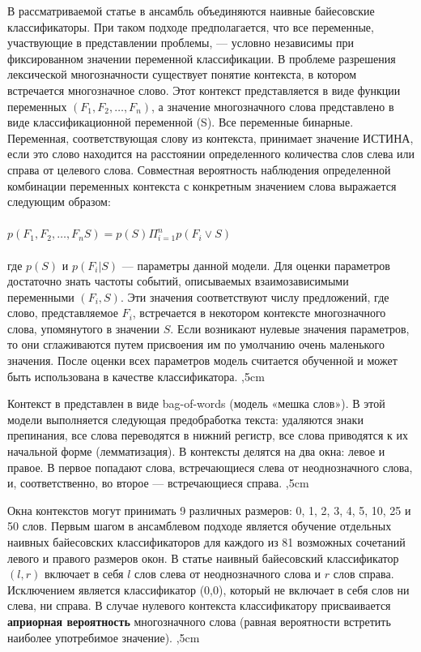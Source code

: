 \documentclass{article}
\begin{document}
\begin{articletext}
В рассматриваемой статье \cite{Pedersen 2000} в ансамбль объединяются наивные байесовские классификаторы. При таком подходе предполагается, что все переменные, участвующие в представлении проблемы, --- условно независимы при фиксированном значении переменной классификации. В проблеме разрешения лексической многозначности существует понятие контекста, в котором встречается многозначное слово. Этот контекст представляется в виде функции переменных $(F_1, F_2, \ldots , F_n)$, а значение многозначного слова представлено в виде классификационной переменной (S). Все переменные бинарные. Переменная, соответствующая слову из контекста, принимает значение ИСТИНА, если это слово находится на расстоянии определенного количества слов слева или справа от целевого слова. Совместная вероятность наблюдения определенной комбинации переменных контекста с конкретным значением слова выражается следующим образом: 
\\
\\
$p(F_1, F_2, \ldots , F_nS) = p(S)\Pi^n_{i=1}p(F_i \vee S)$ 
\\
\\
где $p(S)$ и $p(F_i|S)$ --- параметры данной модели. Для оценки параметров достаточно знать частоты событий, описываемых взаимозависимыми переменными $(F_i,S)$. Эти значения соответствуют числу предложений, где слово, представляемое $F_i$, встречается в некотором контексте многозначного слова, упомянутого в значении $S$. Если возникают нулевые значения параметров, то они сглаживаются путем присвоения им по умолчанию очень маленького значения. После оценки всех параметров модель считается  обученной и может быть использована в качестве классификатора.
,5cm

Контекст в \cite{Pedersen 2000} представлен в виде bag-of-words (модель «мешка слов»). В этой модели выполняется следующая предобработка текста: удаляются знаки препинания, все слова переводятся в нижний регистр, все слова приводятся к их начальной форме (лемматизация). 
В \cite{Pedersen 2000} контексты делятся на два окна: левое и правое. В первое попадают слова, встречающиеся слева от неоднозначного слова, и, соответственно, во второе --- встречающиеся справа.
,5cm

Окна контекстов могут принимать 9 различных размеров: 0, 1, 2, 3, 4, 5, 10, 25 и 50 слов. Первым шагом в ансамблевом подходе является обучение отдельных наивных байесовских классификаторов для каждого из 81 возможных сочетаний левого и правого размеров окон. В статье  \cite{Pedersen 2000} наивный байесовский классификатор $(l,r)$ включает в себя $l$ слов слева от неоднозначного слова и $r$ слов справа. Исключением является классификатор (0,0), который не включает в себя слов ни слева, ни справа. В случае нулевого контекста классификатору присваивается \textbf{априорная вероятность} многозначного слова (равная  вероятности  встретить наиболее употребимое значение).
,5cm


\end{articletext}
\end{document}

